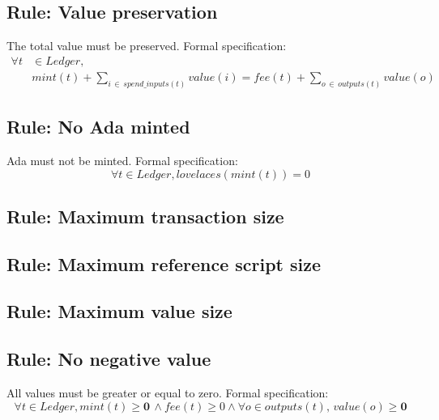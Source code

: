 \documentclass[../midgard.tex]{subfiles}
\begin{document}
\subsection{Rule: Value preservation}
\label{rule:value-preservation}
The total value must be preserved.
Formal specification:
\begin{equation*}
\begin{split}
    \forall t & \in Ledger, \\
    & mint(t) + \sum_{i \, \in \, spend\_inputs(t)} value(i) = fee(t) + \sum_{o \, \in \, outputs(t)} value(o)
\end{split}
\end{equation*}
        

\subsection{Rule: No Ada minted}
\label{rule:no-ada-minted}
Ada must not be minted.
Formal specification:
\begin{equation*}
    \forall t \in Ledger, lovelaces(mint(t)) = 0
\end{equation*}
            
\subsection{Rule: Maximum transaction size}
\label{rule:maximum-transaction-size}


\subsection{Rule: Maximum reference script size}
\label{rule:maximum-reference-script-size}


\subsection{Rule: Maximum value size}
\label{rule:maximum-value-size}


\subsection{Rule: No negative value}
\label{rule:no-negative-value}
All values must be greater or equal to zero.
Formal specification:
\begin{equation*}
    \forall t \in Ledger, mint(t) \geq \mathbf{0} \, \land fee(t) \geq 0 \land \forall o \in outputs(t), \, value(o) \geq \mathbf{0}
\end{equation*}
                
\end{document}

